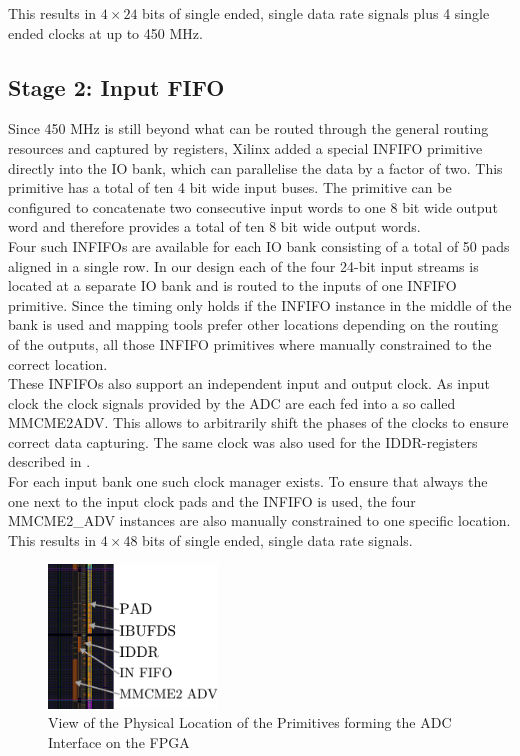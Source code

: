 This results in $4 \times 24$ bits of single ended, single data rate
signals plus 4 single ended clocks at up to 450 MHz. \\

\subsection{Stage 2: Input FIFO}
Since 450 MHz is still beyond what can be routed through the general
routing resources and captured by registers, Xilinx added a special
\gls{INFIFO} primitive directly into the \gls{IO} bank,
which can parallelise the data by a factor of two.
This primitive has a total of ten 4 bit wide input buses.
The primitive can be configured to concatenate two consecutive input words
to one 8 bit wide output word and therefore provides a total of
ten 8 bit wide output words. \\

Four such \glspl{INFIFO} are available for each
\gls{IO} bank consisting of a total of 50 pads aligned in a single row.
In our design each of the four 24-bit input streams is located at a separate
\gls{IO} bank and is routed to the inputs of one \gls{INFIFO} primitive.
Since the timing only holds if the \gls{INFIFO} instance in the middle of the
bank is used and mapping tools prefer other locations depending on the
routing of the outputs, all those \gls{INFIFO} primitives where manually
constrained to the correct location. \\

These \glspl{INFIFO} also support an independent input and output clock.
As input clock the clock signals provided by the \gls{ADC} are each fed
into a so called \gls{MMCME2ADV}.
This allows to arbitrarily shift the phases of the clocks to ensure
correct data capturing. The same clock was also used for the
\gls{IDDR}-registers described in . \\

For each input bank one such clock manager exists. To ensure that
always the one next to the input clock pads and the \gls{INFIFO} is
used, the four MMCME2\_ADV instances are also manually constrained to
one specific location. \\

This results in $4 \times 48$ bits of single ended, single data rate signals. \\

\begin{figure}
  \centering
  \includegraphics[width=0.4\textwidth]{figures/adc_input_bank}
  \caption{View of the Physical Location of the Primitives forming the
    \gls{ADC} Interface on the \gls{FPGA}}
  \label{fig:adc_input_bank}
\end{figure}

